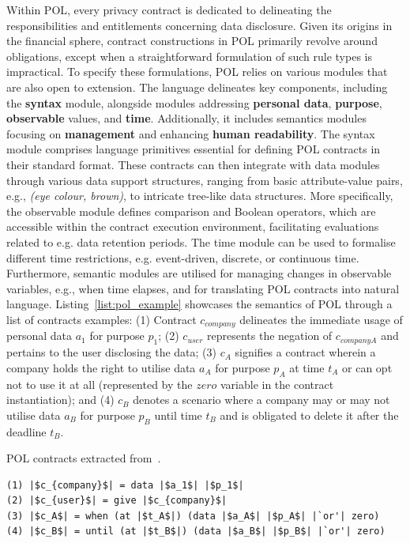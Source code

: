 Within POL, every privacy contract is dedicated to delineating the responsibilities and entitlements concerning data disclosure.
Given its origins in the financial sphere, contract constructions in POL primarily revolve around obligations, except when a straightforward formulation of such rule types is impractical.
To specify these formulations, POL relies on various modules that are also open to extension.
The language delineates key components, including the \textbf{syntax} module, alongside modules addressing \textbf{personal data}, \textbf{purpose}, \textbf{observable} values, and \textbf{time}.
Additionally, it includes semantics modules focusing on \textbf{management} and enhancing \textbf{human readability}.
The syntax module comprises language primitives essential for defining POL contracts in their standard format.
These contracts can then integrate with data modules through various data support structures, ranging from basic attribute-value pairs, e.g., \textit{(eye colour, brown)}, to intricate tree-like data structures.
More specifically, the observable module defines comparison and Boolean operators, which are accessible within the contract execution environment, facilitating evaluations related to e.g. data retention periods.
The time module can be used to formalise different time restrictions, e.g. event-driven, discrete, or continuous time.
Furthermore, semantic modules are utilised for managing changes in observable variables, e.g., when time elapses, and for translating POL contracts into natural language.
Listing~\ref{list:pol_example} showcases the semantics of POL through a list of contracts examples:
(1) Contract $c_{company}$ delineates the immediate usage of personal data $a_1$ for purpose $p_1$;
(2) $c_{user}$ represents the negation of $c_{companyA}$ and pertains to the user disclosing the data;
(3) $c_A$ signifies a contract wherein a company holds the right to utilise data $a_A$ for purpose $p_A$ at time $t_A$ or can opt not to use it at all (represented by the $zero$ variable in the contract instantiation); and
(4) $c_B$ denotes a scenario where a company may or may not utilise data $a_B$ for purpose $p_B$ until time $t_B$ and is obligated to delete it after the deadline $t_B$.

\begin{listing}[ht]
\caption[POL contracts.]{POL contracts extracted from~\cite{berthold_towards_2011}.}
\label{list:pol_example}
\begin{verbatim}
(1) |$c_{company}$| = data |$a_1$| |$p_1$|
(2) |$c_{user}$| = give |$c_{company}$|
(3) |$c_A$| = when (at |$t_A$|) (data |$a_A$| |$p_A$| |`or'| zero)
(4) |$c_B$| = until (at |$t_B$|) (data |$a_B$| |$p_B$| |`or'| zero) 
\end{verbatim}
\end{listing}

